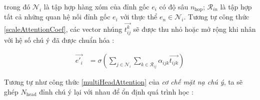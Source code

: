 %
%
%
%
%

trong đó $\mathcal{N}_i$ là tập hợp hàng xóm của đỉnh gốc $e_i$ có độ sâu $n_{\text{hop}}$; $\mathcal{R_{\textit{i} \textit{n}}}$ là tập hợp tất cả những quan hệ nối đỉnh gốc $e_i$ với thực thể $e_n \in \mathcal{N}_i$. Tương tự công thức \ref{scaleAttentionCoef}, các vector nhúng $\overrightarrow{t^k_{ij}}$ sẽ được thu nhỏ hoặc mở rộng khi nhân với hệ số chú ý đã được chuẩn hóa :

\begin{align}
{\overrightarrow{e'_{i}}}&={\sigma\left(\sum_{j \in \mathcal{N}_i} \sum_{k \in \mathcal{R}_{ij}} \alpha_{ijk} \overrightarrow{t_{ijk}}\right)}
\end{align}

Tương tự như công thức \ref{multiHeadAttention} của \textit{cơ chế mặt nạ chú ý}, ta sẽ ghép $N_{\text{head}}$ đỉnh chú ý lại với nhau để ổn định quá trình học :

